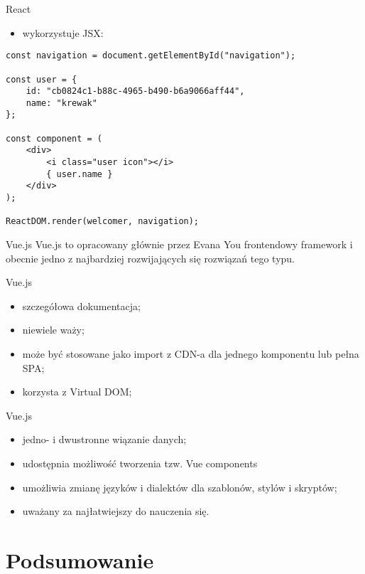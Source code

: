 \begin{frame}[fragile]{React}
	\begin{itemize}
	\item wykorzystuje JSX:
	\end{itemize}
	
	\begin{lstlisting}
const navigation = document.getElementById("navigation");

const user = {
    id: "cb0824c1-b88c-4965-b490-b6a9066aff44",
    name: "krewak"
};

const component = (
    <div>
        <i class="user icon"></i>
        { user.name }
    </div>
);

ReactDOM.render(welcomer, navigation);
	\end{lstlisting}
\end{frame}

\begin{frame}{Vue.js}
	Vue.js to opracowany głównie przez Evana You frontendowy framework i obecnie jedno z najbardziej rozwijających się rozwiązań tego typu.
\end{frame}

\begin{frame}{Vue.js}
	\begin{itemize}
	\item szczegółowa dokumentacja;
	\item niewiele waży;
	\item może być stosowane jako import z CDN-a dla jednego komponentu lub pełna SPA;
	\item korzysta z Virtual DOM;
	\end{itemize}
\end{frame}

\begin{frame}{Vue.js}
	\begin{itemize}
	\item jedno- i dwustronne wiązanie danych;
	\item udostępnia możliwość tworzenia tzw. Vue components
	\item umożliwia zmianę języków i dialektów dla szablonów, stylów i skryptów;
	\item uważany za najłatwiejszy do nauczenia się.
	\end{itemize}
\end{frame}

\section{Podsumowanie}

